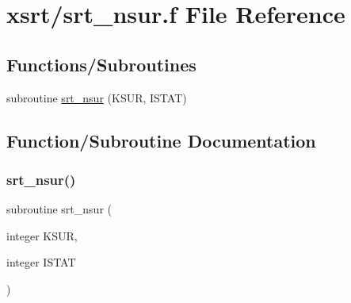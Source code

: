 \hypertarget{srt__nsur_8f}{}\section{xsrt/srt\+\_\+nsur.f File Reference}
\label{srt__nsur_8f}
\subsection*{Functions/\+Subroutines}
\begin{DoxyCompactItemize}
\item 
subroutine \hyperlink{srt__nsur_8f_a80751eaea95f94a6849e5b5bdfa4267f}{srt\+\_\+nsur} (K\+S\+UR, I\+S\+T\+AT)
\end{DoxyCompactItemize}


\subsection{Function/\+Subroutine Documentation}
\mbox{\label{srt__nsur_8f_a80751eaea95f94a6849e5b5bdfa4267f}} 
\subsubsection{\texorpdfstring{srt\+\_\+nsur()}{srt\_nsur()}}
{\footnotesize\ttfamily subroutine srt\+\_\+nsur (\begin{DoxyParamCaption}\item[{integer}]{K\+S\+UR,  }\item[{integer}]{I\+S\+T\+AT }\end{DoxyParamCaption})}

